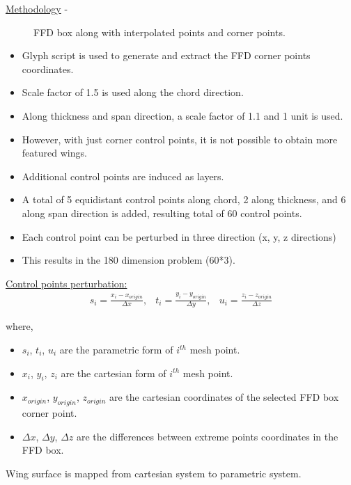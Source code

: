\begin{frame}[allowframebreaks]{\underline{Methodology} -}
{\begin{figure}
    \caption{FFD box along with interpolated points and corner points.}
    \label{ffd_wing_interpolate}
\end{figure}
}
\begin{itemize}
\item Glyph script is used to generate and extract the FFD corner points coordinates.
\item Scale factor of 1.5 is used along the chord direction. 
\item Along thickness and span direction,  a scale factor of 1.1 and 1 unit is used.
\item However, with just corner control points, it is not possible to obtain more featured wings.
\item Additional control points are induced as layers.
\item A total of 5 equidistant control points along chord, 2 along thickness, and 6 along span direction is added, resulting total of 60 control points. 
\item Each control point can be perturbed in three direction (x, y, z directions)
\item This results in the 180 dimension problem (60*3).
\end{itemize}
\underline{Control points perturbation:}
\begin{equation}
\begin{array}{lll}
s_i = \frac{x_i - x_{origin}}{\Delta x}, & t_i = \frac{y_i - y_{origin}}{\Delta y}, & u_i = \frac{z_i - z_{origin}}{\Delta z} 
\end{array}
\label{parameter_equation}
\end{equation}

where,\\
\begin{itemize}
\item $s_i$, $t_i$, $u_i$ are the parametric form of $i^{th}$ mesh point. \\
\item $x_i$, $y_i$, $z_i$ are the cartesian form of $i^{th}$ mesh point. \\
\item $x_{origin}$, $y_{origin}$, $z_{origin}$ are the cartesian coordinates of the selected FFD box corner point. \\
\item $\Delta x$, $\Delta y$, $\Delta z$ are the differences between extreme points coordinates in the FFD box.\\[1mm]
\end{itemize}
Wing surface is mapped from cartesian system to parametric system.\\[1mm]


\end{frame}
